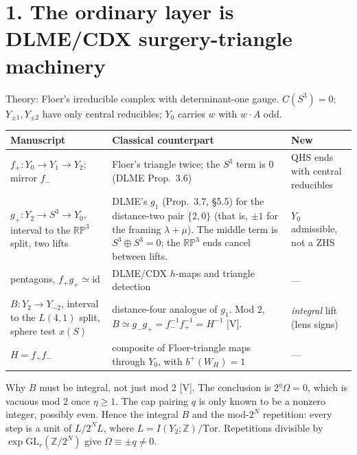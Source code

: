 \documentclass[10pt]{amsart}
\newcommand{\Z}{\mathbb Z}\newcommand{\Q}{\mathbb Q}\newcommand{\F}{\mathbb F}
\newcommand{\V}{\textsf{[V]}}\newcommand{\Pl}{\textsf{[P]}}\newcommand{\Sp}{\textsf{[S]}}
\begin{document}
\section*{1. The ordinary layer is DLME/CDX surgery-triangle machinery}
Theory: Floer's irreducible complex with determinant-one gauge. $C(S^3)=0$; $Y_{\pm1},Y_{\pm2}$ have only central reducibles; $Y_0$ carries $w$ with $w\cdot A$ odd.
\begin{center}\small
\begin{tabular}{@{}p{}p{}p{}@{}}
\toprule
Manuscript & Classical counterpart & New \\ \midrule
$f_+\colon Y_0\to Y_1\to Y_2$; mirror $f_-$ & Floer's triangle twice; the $S^3$ term is $0$ (DLME Prop.~3.6) & QHS ends with central reducibles \\
$g_+\colon Y_2\to S^3\to Y_0$, interval to the $\mathbb{RP}^3$ split, two lifts & DLME's $g_1$ (Prop.~3.7, \S5.5) for the distance-two pair $\{2,0\}$ (that is, $\pm1$ for the framing $\lambda+\mu$). The middle term is $S^3\oplus S^3=0$; the $\mathbb{RP}^3$ ends cancel between lifts. & $Y_0$ admissible, not a ZHS \\
pentagons, $f_+g_+\simeq\mathrm{id}$ & DLME/CDX $h$-maps and triangle detection & --- \\
$B\colon Y_2\to Y_{-2}$, interval to the $L(4,1)$ split, sphere test $x(S)$ & distance-four analogue of $g_1$. Mod 2, $B\simeq g_-g_+=f_-^{-1}f_+^{-1}=H^{-1}$ \V. & \emph{integral} lift (lens signs) \\
$H=f_+f_-$ & composite of Floer-triangle maps through $Y_0$, with $b^+(W_H)=1$ & --- \\
\bottomrule
\end{tabular}
\end{center}
Why $B$ must be integral, not just mod 2 \V. The conclusion is $2^\eta\Omega=0$, which is vacuous mod 2 once $\eta\ge1$. The cap pairing $q$ is only known to be a nonzero integer, possibly even. Hence the integral $B$ and the mod-$2^N$ repetition: every step is a unit of $L/2^NL$, where $L=I(Y_2;\Z)/\mathrm{Tor}$. Repetitions divisible by $\exp\mathrm{GL}_r(\Z/2^N)$ give $\Omega\equiv\pm q\ne0$.
\end{document}
